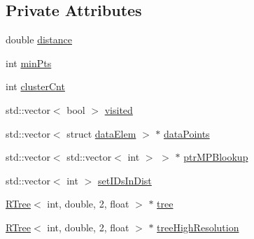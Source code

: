 \subsection*{Private Attributes}
\begin{DoxyCompactItemize}
\item 
double \hyperlink{classDBScan_a9878125297973f29db8b41287e0c9b4d}{distance}
\item 
int \hyperlink{classDBScan_ad117fc93029bcc699b919bb17e658292}{min\-Pts}
\item 
int \hyperlink{classDBScan_af88f51ce2f50e9f26c813426131497e9}{cluster\-Cnt}
\item 
std\-::vector$<$ bool $>$ \hyperlink{classDBScan_a03bbe4567af4354c0cba4e580cf72578}{visited}
\item 
std\-::vector$<$ struct \hyperlink{structdataElem}{data\-Elem} $>$ $\ast$ \hyperlink{classDBScan_a247c7a0e0cd8f2aa24770bced14b82b5}{data\-Points}
\item 
std\-::vector$<$ std\-::vector$<$ int $>$ $>$ $\ast$ \hyperlink{classDBScan_a4f4c2b033e9c3ec3bfb1cc43744e36a3}{ptr\-M\-P\-Blookup}
\item 
std\-::vector$<$ int $>$ \hyperlink{classDBScan_affdefd0416bc3ba42ee2c069d8ac7eb3}{set\-I\-Ds\-In\-Dist}
\item 
\hyperlink{classRTree}{R\-Tree}$<$ int, double, 2, float $>$ $\ast$ \hyperlink{classDBScan_a406fc451a7b6b25b11cb08545a03e281}{tree}
\item 
\hyperlink{classRTree}{R\-Tree}$<$ int, double, 2, float $>$ $\ast$ \hyperlink{classDBScan_a8fd30e735fa3b426e519a8ecb7586c4d}{tree\-High\-Resolution}
\end{DoxyCompactItemize}


